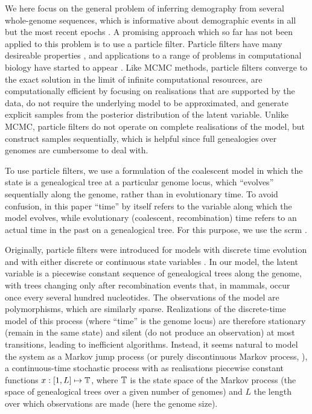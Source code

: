 We here focus on the general problem of inferring demography from several
whole-genome sequences,
which is informative about demographic events in all but the most recent epochs \cite{Schiffels2014b,Li2011a}.
A promising approach which so far has not been applied to this
problem is to use a particle filter.  Particle filters have many
desireable
properties \cite{Arulampalam2002,Doucet2000,Gordon1993},
and applications to a range of problems in computational biology have started to appear
\cite{L2020,M2018,RA2017,Taylor2014}.
Like MCMC methods, particle filters converge to the exact solution in
the limit of infinite computational resources, are computationally efficient by focusing on realisations that are 
supported by the data, do not require the underlying model to be
approximated, and generate explicit samples from the posterior distribution of the latent variable.
Unlike MCMC, particle filters do not operate on complete realisations
of the model, but construct samples sequentially, which is helpful
since full genealogies over genomes are cumbersome to deal with.

To use particle filters, we use a formulation of the coalescent model
in which the state is a genealogical tree at a particular genome
locus, which ``evolves'' sequentially along the genome, rather than in evolutionary
time.  To avoid confusion, in this paper ``time'' by itself refers to
the variable along which the model evolves, while evolutionary
(coalescent, recombination) time refers to an actual time in the past
on a genealogical tree. For this purpose, we use the \gls{scrm} \cite{Staab2015}.

Originally, particle filters were introduced for models with discrete time evolution
and with either discrete or continuous state variables
\cite{Rosenbluth2004,Gordon1993}.
In our model, the latent variable is a piecewise constant sequence of
genealogical trees along the genome, with trees changing only after
recombination events that, in mammals, occur once every several hundred nucleotides.
The observations of the model are polymorphisms, which are similarly sparse.
Realizations of the discrete-time model of this process (where ``time'' is
the genome locus) are therefore stationary (remain in the same state)
and silent (do not produce an observation) at most
transitions, leading to inefficient algorithms.
Instead, it seems natural to model the system as a
Markov jump process (or purely discontinuous Markov process, \cite{Feller1940}),
a continuous-time stochastic process with as realisations piecewise constant functions $x:[1,L]\mapsto\mathbb{T}$, where $\mathbb{T}$ is the state space of the Markov process (the
space of genealogical trees over a given number of genomes) and
$L$ the length over which observations are made (here the genome size).

